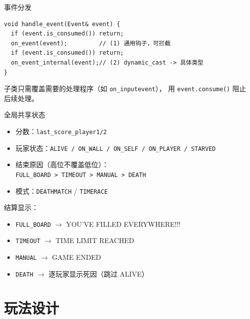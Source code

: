 \documentclass[aspectratio=169,13pt]{beamer}
\begin{document}
\begin{frame}[fragile]{事件分发}
\begin{verbatim}
void handle_event(Event& event) {
  if (event.is_consumed()) return;
  on_event(event);         // (1) 通用钩子，可拦截
  if (event.is_consumed()) return;
  on_event_internal(event);// (2) dynamic_cast -> 具体类型
}
\end{verbatim}
  \vspace{0.3em}
  子类只需覆盖需要的处理程序（如 \texttt{on\_inputevent}），
  用 \texttt{event.consume()} 阻止后续处理。
\end{frame}

\begin{frame}{全局共享状态}
  \footnotesize
  \begin{itemize}
    \item 分数：\texttt{last\_score\_player1/2}
    \item 玩家状态：\texttt{ALIVE / ON\_WALL / ON\_SELF / ON\_PLAYER / STARVED}
    \item 结束原因（高位不覆盖低位）：\\
      \texttt{FULL\_BOARD > TIMEOUT > MANUAL > DEATH}
    \item 模式：\texttt{DEATHMATCH} / \texttt{TIMERACE}
  \end{itemize}

  \vspace{0.3em}
  结算显示：
  \begin{itemize}
    \item \texttt{FULL\_BOARD} $\rightarrow$ YOU'VE FILLED EVERYWHERE!!!
    \item \texttt{TIMEOUT} $\rightarrow$ TIME LIMIT REACHED
    \item \texttt{MANUAL} $\rightarrow$ GAME ENDED
    \item \texttt{DEATH} $\rightarrow$ 逐玩家显示死因（跳过 ALIVE）
  \end{itemize}
\end{frame}

\section{玩法设计}
\end{document}
